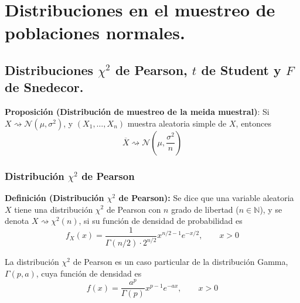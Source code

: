 \documentclass{article}
\begin{document}
\section{Distribuciones en el muestreo de poblaciones normales.}
\subsection{Distribuciones $\chi^2$ de Pearson, $t$ de Student y $F$ de Snedecor.}
\textbf{Proposición (Distribución de muestreo de la meida muestral)}: Si $X\rightsquigarrow \mathcal{N}(\mu,\sigma^2)$, y $(X_1,\ldots,X_n)$ muestra aleatoria simple de $X$, entonces
\begin{equation*}
\overline{X}\rightsquigarrow \mathcal{N}\left(\mu,\frac{\sigma^2}{n}\right)
\end{equation*}

\subsubsection{Distribución $\chi^2$ de Pearson}
\textbf{Definición (Distribución $\chi^2$ de Pearson):} Se dice que una variable aleatoria $X$ tiene una distribución $\chi^2$ de Pearson con $n$ grado de libertad ($n\in\mathbb{N}$), y se denota $X\rightsquigarrow \chi^2(n)$, si su función de densidad de probabilidad es
\begin{equation*}
f_X(x)=\frac{1}{\Gamma(n/2)\cdot 2^{n/2}}x^{n/2-1}e^{-x/2},\qquad x>0
\end{equation*}

La distribución $\chi^2$ de Pearson es un caso particular de la distribución Gamma, $\Gamma(p,a)$, cuya función de densidad es
\begin{equation*}
f(x)=\frac{a^p}{\Gamma(p)}x^{p-1}e^{-ax},\qquad x>0
\end{equation*}
\end{document}
